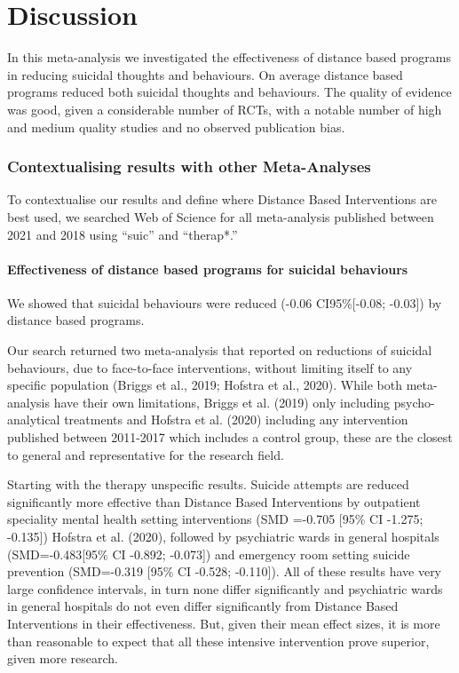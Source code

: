 \documentclass[
  english,
  man]{apa6}
\let\oldparagraph\paragraph
\renewcommand{\paragraph}[1]{\oldparagraph{#1}\mbox{}}
\begin{document}
\hypertarget{discussion}{%
\section{Discussion}\label{discussion}}

In this meta-analysis we investigated the effectiveness of distance based programs in reducing suicidal thoughts and behaviours. On average distance based programs reduced both suicidal thoughts and behaviours. The quality of evidence was good, given a considerable number of RCTs, with a notable number of high and medium quality studies and no observed publication bias.

\hypertarget{contextualising-results-with-other-meta-analyses}{%
\subsubsection{Contextualising results with other Meta-Analyses}\label{contextualising-results-with-other-meta-analyses}}

To contextualise our results and define where Distance Based Interventions are best used, we searched Web of Science for all meta-analysis published between 2021 and 2018 using ``suic'' and ``therap*.''

\hypertarget{effectiveness-of-distance-based-programs-for-suicidal-behaviours}{%
\paragraph{Effectiveness of distance based programs for suicidal behaviours}\label{effectiveness-of-distance-based-programs-for-suicidal-behaviours}}

We showed that suicidal behaviours were reduced (-0.06 CI95\%{[}-0.08; -0.03{]}) by distance based programs.

Our search returned two meta-analysis that reported on reductions of suicidal behaviours, due to face-to-face interventions, without limiting itself to any specific population (Briggs et al., 2019; Hofstra et al., 2020). While both meta-analysis have their own limitations, Briggs et al. (2019) only including psycho-analytical treatments and Hofstra et al. (2020) including any intervention published between 2011-2017 which includes a control group, these are the closest to general and representative for the research field.

Starting with the therapy unspecific results. Suicide attempts are reduced significantly more effective than Distance Based Interventions by outpatient speciality mental health setting interventions (SMD =-0.705 {[}95\% CI -1.275; -0.135{]}) Hofstra et al. (2020), followed by psychiatric wards in general hospitals (SMD=-0.483{[}95\% CI -0.892; -0.073{]}) and emergency room setting suicide prevention (SMD=-0.319 {[}95\% CI -0.528; -0.110{]}). All of these results have very large confidence intervals, in turn none differ significantly and psychiatric wards in general hospitals do not even differ significantly from Distance Based Interventions in their effectiveness. But, given their mean effect sizes, it is more than reasonable to expect that all these intensive intervention prove superior, given more research.
\end{document}
